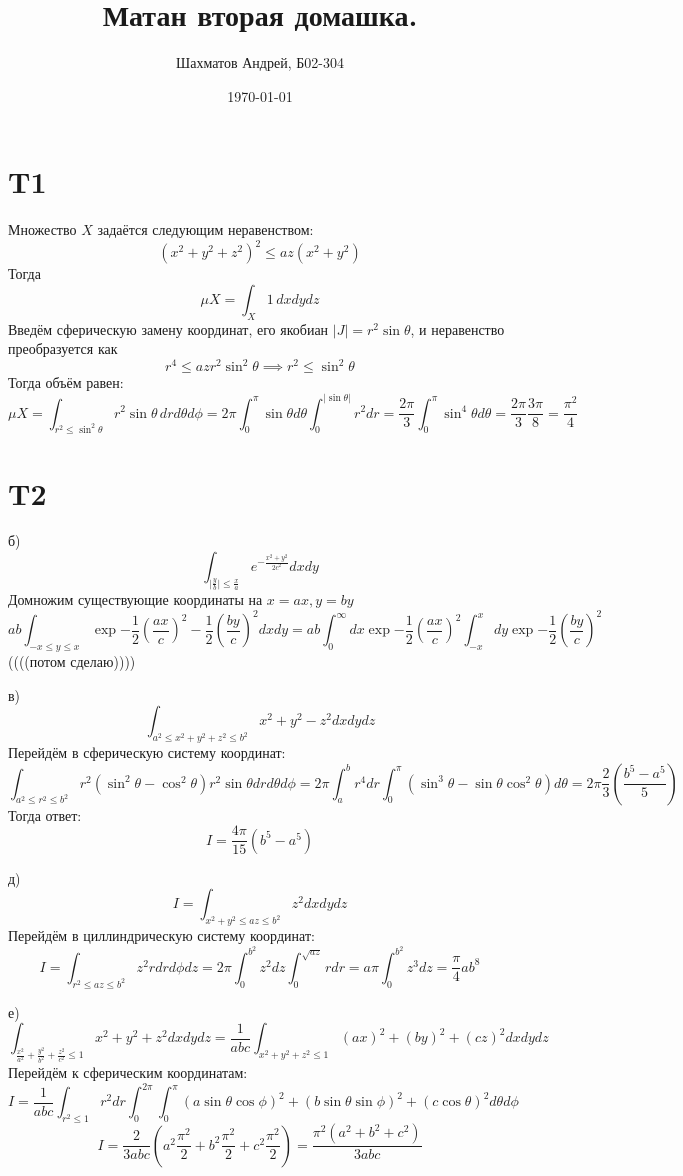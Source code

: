 \documentclass[12pt]{article}
\title{Матан вторая домашка.}
\author{Шахматов Андрей, Б02-304}
\date{\today}
\begin{document}
\maketitle
\tableofcontents

\section{T1}
Множество $X$ задаётся следующим неравенством: 
\[
    (x^2 + y^2 + z^2)^2 \leq az(x^2 + y^2)
\]
Тогда 
\[
    \mu X = \int_{X} 1 \,dx dy dz
\]
Введём сферическую замену координат, его якобиан $\vert J \vert = r^2 \sin \theta$, и неравенство преобразуется как
\[
    r^4 \leq az r^2 \sin^2 \theta \implies r^2 \leq \sin^2 \theta 
\]
Тогда объём равен: 
\[
    \mu X = \int_{r^2 \leq \sin^2 \theta} r^2 \sin \theta \,dr d \theta d \phi = 2\pi \int_{0}^{\pi} \sin \theta d \theta \int_{0}^{\vert \sin \theta \vert} r^2 dr = 
    \frac{2\pi}{3} \int_0^{\pi} \sin^4 \theta d \theta = \frac{2\pi}{3} \frac{3\pi}{8} = \frac{\pi^2}{4}
\]
\section{T2}
б)
\[
    \int_{\vert \frac{y}{b} \vert \leq \frac{x}{a}} e^{-\frac{x^2 + y^2}{2c^2}} dx dy
\]
Домножим существующие координаты на $x = ax, y = by$
\[
    ab \int_{-x \leq y \leq x} \exp {-\frac{1}{2}\left( \frac{ax}{c} \right)^2 - \frac{1}{2} \left( \frac{by}{c} \right)^2} dx dy = 
    ab \int_0^{\infty} dx \exp {-\frac{1}{2} \left( \frac{ax}{c} \right)^2 } \int_{-x}^{x} dy \exp {-\frac{1}{2} \left( \frac{by}{c} \right)^2 }
\] 
((((потом сделаю))))

в)
\[
    \int_{a^2 \leq x^2 + y^2 + z^2 \leq b^2} x^2 + y^2 - z^2 dx dy dz
\]
Перейдём в сферическую систему координат: 
\[
    \int_{a^2 \leq r^2 \leq b^2} r^2(\sin^2 \theta - \cos^2 \theta) r^2 \sin \theta dr d \theta  d \phi = 
    2\pi \int_a^b r^4 dr \int_0^{\pi} (\sin^3 \theta - \sin \theta \cos^2 \theta ) d \theta = 
    2\pi \frac{2}{3} \left( \frac{b^5 - a^5}{5} \right)
\]
Тогда ответ: 
\[
    I = \frac{4\pi}{15} (b^5 - a^5)
\]

д)
\[
    I = \int_{x^2 + y^2 \leq az \leq b^2} z^2 dx dy dz
\] 
Перейдём в циллиндрическую систему координат: 
\[
    I = \int_{r^2 \leq az \leq b^2} z^2 r dr d \phi dz = 
    2\pi \int_0^{b^2} z^2 dz \int_0^{\sqrt{az}} r dr = 
    a\pi \int_0^{b^2} z^3 dz = \frac{\pi}{4} ab^8
\]

е) 
\[
    \int_{\frac{x^2}{a^2} + \frac{y^2}{b^2} + \frac{z^2}{c^2} \leq 1} x^2 + y^2 + z^2 dx dy dz = 
    \frac{1}{abc} \int_{x^2 + y^2 + z^2 \leq 1} (ax)^2 + (by)^2 + (cz)^2 dx dy dz
\]
Перейдём к сферическим координатам: 
\[
    I = \frac{1}{abc} \int_{r^2 \leq 1} r^2 dr \int_{0}^{2\pi} \int_{0}^{\pi} (a\sin \theta \cos \phi)^2 + (b\sin \theta \sin \phi)^2 + (c\cos \theta)^2 d \theta d \phi
\]
\[
    I = \frac{2}{3abc} \left( a^2\frac{\pi^2}{2} + b^2\frac{\pi^2}{2} + c^2\frac{\pi^2}{2} \right) = 
    \frac{\pi^2 (a^2 + b^2 + c^2)}{3abc}
\]
\end{document}
